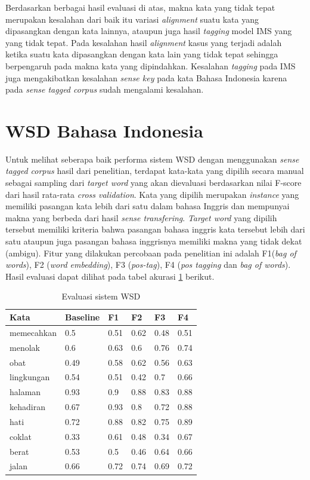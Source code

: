 Berdasarkan berbagai hasil evaluasi di atas, makna kata yang tidak tepat merupakan kesalahan dari baik itu variasi \textit{alignment} suatu kata yang dipasangkan dengan kata lainnya, ataupun juga hasil \textit{tagging} model IMS yang yang tidak tepat. Pada kesalahan hasil \textit{alignment} kasus yang terjadi adalah ketika suatu kata dipasangkan dengan kata lain yang tidak tepat sehingga berpengaruh pada makna kata yang dipindahkan. Kesalahan \textit{tagging} pada IMS juga mengakibatkan kesalahan \textit{sense key} pada kata Bahasa Indonesia karena pada \textit{sense tagged corpus} sudah mengalami kesalahan.
\section{WSD Bahasa Indonesia}

Untuk melihat seberapa baik performa sistem WSD dengan menggunakan \textit{sense tagged corpus} hasil dari penelitian, terdapat kata-kata yang dipilih secara manual sebagai sampling dari \textit{target word} yang akan dievaluasi berdasarkan nilai F-score dari hasil rata-rata \textit{cross validation}. Kata yang dipilih merupakan \textit{instance} yang memiliki pasangan kata lebih dari satu dalam bahasa Inggris dan mempunyai makna yang berbeda dari hasil \textit{sense transfering}. \textit{Target word} yang dipilih tersebut memiliki kriteria bahwa pasangan bahasa inggris kata tersebut lebih dari satu ataupun juga pasangan bahasa inggrisnya memiliki makna yang tidak dekat (ambigu). Fitur yang dilakukan percobaan pada penelitian ini adalah F1(\textit{bag of words}), F2 (\textit{word embedding}), F3 (\textit{pos-tag}), F4 (\textit{pos tagging} dan \textit{bag of words}). Hasil evaluasi dapat dilihat pada tabel akurasi  \ref{table:wsd-evaluation-crawling} berikut.
\begin{table}
	\centering
	\caption{Evaluasi sistem WSD}
	\label{table:wsd-evaluation-crawling}
	\begin{tabular}{|p{3cm}|p{1.5cm}|p{1.5cm}|p{1.5cm}|p{1.5cm}|p{1.5cm}|}
		\hline
		\textbf{Kata} & \textbf{Baseline} & \textbf{F1} & \textbf{F2} & \textbf{F3} & \textbf{F4} \\ \hline
		memecahkan & 0.5 & 0.51 & 0.62 & 0.48 & 0.51 \\ \hline
		menolak & 0.6 & 0.63 & 0.6 & 0.76 & 0.74 \\ \hline
		obat & 0.49 & 0.58 & 0.62 & 0.56 & 0.63 \\ \hline
		lingkungan & 0.54 & 0.51 & 0.42 & 0.7 & 0.66 \\ \hline
		halaman & 0.93 & 0.9 & 0.88 & 0.83 & 0.88 \\ \hline
		kehadiran & 0.67 & 0.93 & 0.8 & 0.72 & 0.88 \\ \hline
		hati & 0.72 & 0.88 & 0.82 & 0.75 & 0.89 \\ \hline
		coklat & 0.33 & 0.61 & 0.48 & 0.34 & 0.67 \\ \hline
		berat & 0.53 & 0.5 & 0.46 & 0.64 & 0.66 \\ \hline
		jalan & 0.66 & 0.72 & 0.74 & 0.69 & 0.72 \\ \hline
	\end{tabular} 
\end{table}


